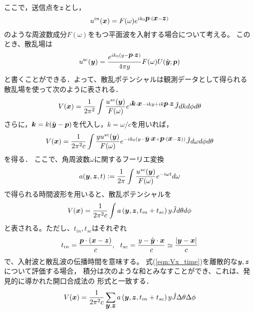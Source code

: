 \documentclass[10pt,a4j,dvipdfmx]{jarticle}
\begin{document}
ここで，送信点を$\mbox{\boldmath $z$}$とし，
\begin{equation}
	u^{in}(\mbox{\boldmath $x$})= F(\omega) e^{ik_0\mbox{\boldmath $p$}\cdot(\mbox{\boldmath $x$}-\mbox{\boldmath $z$})}
	\label{eqn:}
\end{equation}
のような周波数成分$F(\omega)$をもつ平面波を入射する場合について考える。
このとき、散乱場は
\begin{equation}
	u^{\rm sc}(\mbox{\boldmath $y$})= \frac{e^{ik_0(y-\mbox{\boldmath $p$}\cdot \mbox{\boldmath $z$})}}{4\pi y }F(\omega)U(\hat{\mbox{\boldmath $y$}};\mbox{\boldmath $p$}) 
	\label{eqn:}
\end{equation}
と書くことができる．よって、散乱ポテンシャルは観測データとして得られる
散乱場を使って次のように表される．
\begin{equation}
	V(\mbox{\boldmath $x$}) =\frac{1}{2\pi^2} \int \frac{u^{sc}(\mbox{\boldmath $y$})}{F(\omega)}
	e^{i\mbox{\boldmath $k$}\cdot \mbox{\boldmath $x$}-iky+ik\mbox{\boldmath $p$}\cdot\mbox{\boldmath $z$}}
	\hat{J} dkd\phi d\theta	
	\label{eqn:}
\end{equation}
さらに，$\mbox{\boldmath $k$}=k(\hat{\mbox{\boldmath $y$}}-\mbox{\boldmath $p$})$を代入し，$k=\omega/c$を用いれば，
\begin{equation}
	V(\mbox{\boldmath $x$}) =\frac{1}{2\pi^2c} \int \frac{yu^{sc}(\mbox{\boldmath $y$})}{F(\omega)}
	e^{-ik_0(y-\hat{\mbox{\boldmath $y$}}\cdot\mbox{\boldmath $x$}+\mbox{\boldmath $p$}\cdot(\mbox{\boldmath $x$}-\mbox{\boldmath $z$})) }
	\hat{J} d\omega d\phi d\theta	
	\label{eqn:}
\end{equation}
を得る．
ここで、角周波数$\omega$に関するフーリエ変換
\begin{equation}
	a(\mbox{\boldmath $y$},\mbox{\boldmath $z$},t):=\frac{1}{2\pi} \int \frac{u^{sc}(\mbox{\boldmath $y$})}{F(\omega)}e^{-i\omega t}d\omega
	\label{eqn:}
\end{equation}
で得られる時間波形を用いると、散乱ポテンシャルを
\begin{equation}
	V(\mbox{\boldmath $x$}) =\frac{1}{2\pi^2c} \int a\left(\mbox{\boldmath $y$}, \mbox{\boldmath $z$}, t_{in}+t_{sc} \right) y \hat{J} d\theta d\phi
	\label{eqn:Vx_time}
\end{equation}
と表される。ただし、$t_{in},t_{sc}$はそれぞれ
\begin{equation}
	t_{in}=\frac{\fat{p}\cdot \left( \fat{x}-\fat{z}\right)}{c}, \ \ 
	t_{sc}=
	\frac{ y-\hat{\fat{y}}\cdot \fat{x} }{c} \simeq 
	\frac{\left|\fat{y}-\fat{x}\right|}{c} 
	\label{eqn:}
\end{equation}
で、入射波と散乱波の伝播時間を意味する。
式(\ref{eqn:Vx_time})を離散的な$\mbox{\boldmath $y$},\mbox{\boldmath $z$}$について評価する場合，
積分は次のような和とみなすことができ、これは、発見的に導かれた開口合成法の
形式と一致する．
\begin{equation}
	V(\mbox{\boldmath $x$}) = 
	\frac{1}{2\pi^2c} 
	\sum_{\mbox{\boldmath $y$},\mbox{\boldmath $z$}} 
	a\left(\mbox{\boldmath $y$}, \mbox{\boldmath $z$}, t_{in}+t_{sc} \right) y \hat{J} \Delta \theta \Delta \phi
	\label{eqn:}
\end{equation}
\end{document}
